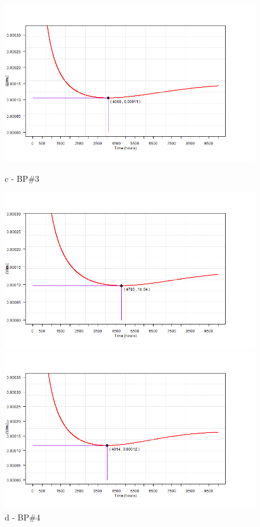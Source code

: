 \begin{figure}[!htb]
\begin{minipage}[b]{0.5\linewidth}
	\centering
	\includegraphics[width=\textwidth]{figures/ch05_fig_ois_pump3}
	\caption*{c - BP\#3}
\end{minipage}
	\hspace{0.05cm}
\begin{minipage}[b]{0.5\linewidth}
	\centering
	\includegraphics[width=\textwidth]{figures/ch05_fig_ois_pump4}
	\caption*{d - BP\#4}
\end{minipage}
	\hspace{0.05cm}
\begin{minipage}[b]{0.5\linewidth}
	\centering
	\includegraphics[width=\textwidth]{figures/ch05_fig_ois_pump5}

\end{minipage}
\end{figure}
